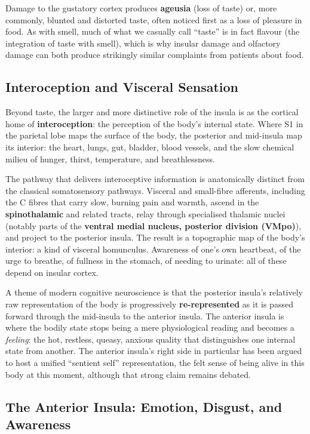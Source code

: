 \documentclass[11pt]{article}
\begin{document}
Damage to the gustatory cortex produces \textbf{ageusia} (loss of taste) or, more commonly, blunted and distorted taste, often noticed first as a loss of pleasure in food. As with smell, much of what we casually call ``taste'' is in fact flavour (the integration of taste with smell), which is why insular damage and olfactory damage can both produce strikingly similar complaints from patients about food.

\subsection{Interoception and Visceral Sensation}

Beyond taste, the larger and more distinctive role of the insula is as the cortical home of \textbf{interoception}: the perception of the body's internal state. Where S1 in the parietal lobe maps the surface of the body, the posterior and mid-insula map its interior: the heart, lungs, gut, bladder, blood vessels, and the slow chemical milieu of hunger, thirst, temperature, and breathlessness.

The pathway that delivers interoceptive information is anatomically distinct from the classical somatosensory pathways. Visceral and small-fibre afferents, including the C fibres that carry slow, burning pain and warmth, ascend in the \textbf{spinothalamic} and related tracts, relay through specialised thalamic nuclei (notably parts of the \textbf{ventral medial nucleus, posterior division (VMpo)}), and project to the posterior insula. The result is a topographic map of the body's interior: a kind of visceral homunculus. Awareness of one's own heartbeat, of the urge to breathe, of fullness in the stomach, of needing to urinate: all of these depend on insular cortex.

A theme of modern cognitive neuroscience is that the posterior insula's relatively raw representation of the body is progressively \textbf{re-represented} as it is passed forward through the mid-insula to the anterior insula. The anterior insula is where the bodily state stops being a mere physiological reading and becomes a \textit{feeling}: the hot, restless, queasy, anxious quality that distinguishes one internal state from another. The anterior insula's right side in particular has been argued to host a unified ``sentient self'' representation, the felt sense of being alive in this body at this moment, although that strong claim remains debated.

\subsection{The Anterior Insula: Emotion, Disgust, and Awareness}
\end{document}
